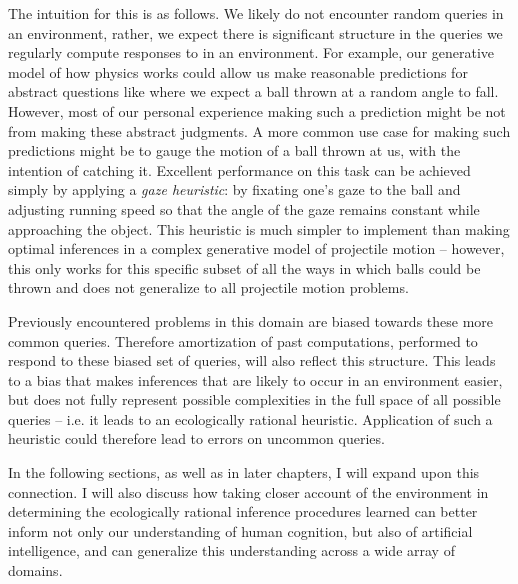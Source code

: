 The intuition for this is as follows. We likely do not encounter random queries in an environment, rather, we expect there is significant structure in the queries we regularly compute responses to in an environment. For example, our generative model of how physics works could allow us make reasonable predictions for abstract questions like where we expect a ball thrown at a random angle to fall. However, most of our personal experience making such a prediction might be not from making these abstract judgments. A more common use case for making such predictions might be to gauge the motion of a ball thrown at us, with the intention of catching it. Excellent performance on this task can be achieved simply by applying a \textit{gaze heuristic}\cite{gigerenzer2009homo}: by fixating one's gaze to the ball and adjusting running speed so that the angle of the gaze remains constant while approaching the object. This heuristic is much simpler to implement than making optimal inferences in a complex generative model of projectile motion -- however, this only works for this specific subset of all the ways in which balls could be thrown and does not generalize to all projectile motion problems.

Previously encountered problems in this domain are biased towards these more common queries. Therefore amortization of past computations, performed to respond to these biased set of queries, will also reflect this structure. This leads to a bias that makes inferences that are likely to occur in an environment easier, but does not fully represent possible complexities in the full space of all possible queries -- i.e. it leads to an ecologically rational heuristic. Application of such a heuristic could therefore lead to errors on uncommon queries.

In the following sections, as well as in later chapters, I will expand upon this connection. I will also discuss how taking closer account of the environment in determining the ecologically rational inference procedures learned can better inform not only our understanding of human cognition, but also of artificial intelligence, and can generalize this understanding across a wide array of domains.



